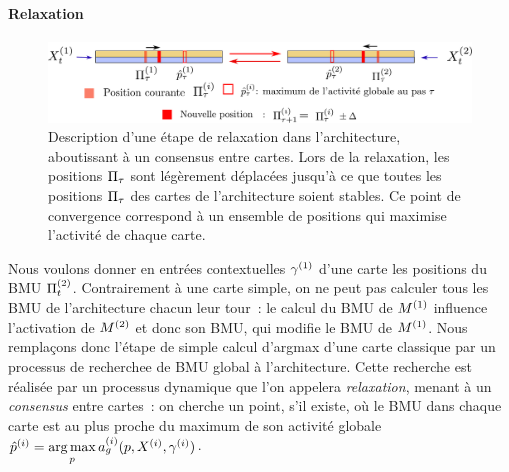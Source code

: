 \documentclass[../main]{subfiles}
\begin{document}
\paragraph{Relaxation}\label{sec:relax}
\begin{figure}
    \centering
    \includegraphics[width=\textwidth]{relaxation_2maps.pdf}
    \caption{Description d'une étape de relaxation dans l'architecture, aboutissant à un consensus entre cartes. Lors de la relaxation, les positions $\Pi_\tau$ sont légèrement déplacées jusqu'à ce que toutes les positions $\Pi_\tau$ des cartes de l'architecture soient stables. Ce point de convergence correspond à un ensemble de positions qui maximise l'activité de chaque carte. \label{fig:relax}}
    \end{figure}

Nous voulons donner en entrées contextuelles $\gamma^{({1})}$ d'une carte les positions du BMU $\Pi^{({2})}_t$.
Contrairement à une carte simple, on ne peut pas calculer tous les BMU de l'architecture chacun leur tour~: le calcul du BMU de $M^{({1})}$ influence l'activation de $M^{({2})}$ et donc son BMU, qui modifie le BMU de $M^{({1})}$.
Nous remplaçons donc l'étape de simple calcul d'argmax d'une carte classique par un processus de recherchee de BMU global à l'architecture. Cette recherche est réalisée par un processus dynamique que l'on appelera \emph{relaxation}, menant à un \emph{consensus} entre cartes~: on cherche un point, s'il existe, où le BMU dans chaque carte est au plus proche du maximum de son activité globale $\hat{p}^{({i})} = \operatorname*{arg\,max}\limits_p a_g^{({i})}(p, X^{({i})}, \gamma^{({i})})$.
\end{document}

